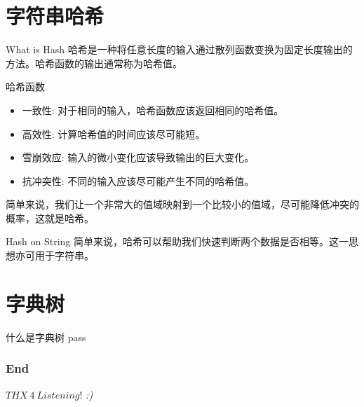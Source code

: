 \documentclass{ldr-simple-gray}
\begin{document}
  \section{字符串哈希}
  \begin{frame}{What is Hash}
    哈希是一种将任意长度的输入通过散列函数变换为固定长度输出的方法。哈希函数的输出通常称为哈希值。
    \begin{block}{哈希函数}
      \begin{itemize}
        \item 一致性: 对于相同的输入，哈希函数应该返回相同的哈希值。
        \item 高效性: 计算哈希值的时间应该尽可能短。
        \item 雪崩效应: 输入的微小变化应该导致输出的巨大变化。
        \item 抗冲突性: 不同的输入应该尽可能产生不同的哈希值。
      \end{itemize}
    \end{block}
    简单来说，我们让一个非常大的值域映射到一个比较小的值域，尽可能降低冲突的概率，这就是哈希。
  \end{frame}

  \begin{frame}{Hash on String}
    简单来说，哈希可以帮助我们快速判断两个数据是否相等。这一思想亦可用于字符串。
  \end{frame}

  \section{字典树}
  \begin{frame}{什么是字典树}
    pass
  \end{frame}

  \begin{frame} %
    \frametitle{End}
    \begin{center}
      \Huge{$THX\ 4\ Listening!$}
      \emph{:)}
    \end{center}
  \end{frame}
\end{document}
